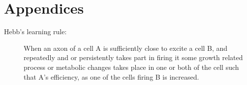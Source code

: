 
\chapter*{\centering Appendices}%
\begin{center}
\end{center}
\begin{description}
    \item[Hebb's learning rule:] When an axon of a cell A is sufficiently close to excite
        a cell B, and repeatedly and or persistently takes part in firing it some
        growth related process or metabolic changes takes place in one or both of the
        cell such that A's efficiency, as one of the cells firing B is increased.
\end{description}



